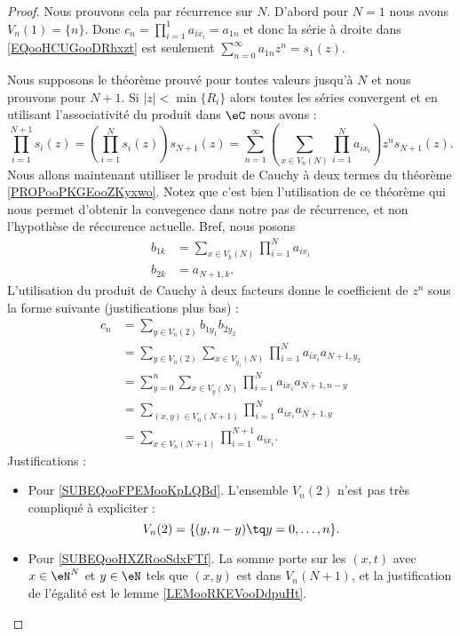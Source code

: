 \begin{proof}
	Nous prouvons cela par récurrence sur \( N\). D'abord pour \( N=1\) nous avons \( V_n(1)=\{ n \}\). Donc \( c_n=\prod_{i=1}^1a_{ix_i}=a_{1n}\) et donc la série à droite dans \eqref{EQooHCUGooDRhxzt} est seulement \( \sum_{n=0}^{\infty}a_{1n}z^n=s_1(z)\).

	Nous supposons le théorème prouvé pour toutes valeurs jusqu'à \( N\) et nous prouvons pour \( N+1\). Si \( | z |<\min\{ R_i \}\) alors toutes les séries convergent et en utilisant l'associativité du produit dans \( \eC\) nous avons :
	\begin{equation}
		\prod_{i=1}^{N+1}s_i(z)=\left( \prod_{i=1}^Ns_i(z) \right)s_{N+1}(z)=\sum_{n=1}^{\infty}\left( \sum_{x\in V_n(N)}\prod_{i=1}^Na_{ix_i} \right)z^ns_{N+1}(z).
	\end{equation}
	Nous allons maintenant utilliser le produit de Cauchy à deux termes du théorème \ref{PROPooPKGEooZKyxwo}. Notez que c'est bien l'utilisation de ce théorème qui nous permet d'obtenir la convegence dans notre pas de récurrence, et non l'hypothèse de réccurence actuelle. Bref, nous posons
	\begin{subequations}
		\begin{align}
			b_{1k} & =\sum_{x\in V_k(N)}\prod_{i=1}^Na_{ix_i} \\
			b_{2k} & =a_{N+1,k}.
		\end{align}
	\end{subequations}
	L'utilisation du produit de Cauchy à deux facteurs donne le coefficient de \( z^n\) sous la forme suivante (justifications plus bas)  :
	\begin{subequations}
		\begin{align}
			c_n & =\sum_{y\in V_n(2)}b_{1y_1}b_{2y_2}                                                                \\
			    & =\sum_{y\in V_n(2)}\sum_{x\in V_{y_1}(N)}\prod_{i=1}^Na_{ix_i}a_{N+1,y_2}                          \\
			    & =\sum_{y=0}^n\sum_{x\in V_y(N)}\prod_{i=1}^Na_{ix_i}a_{N+1,n-y}        \label{SUBEQooFPEMooKpLQBd} \\
			    & =\sum_{(x,y)\in V_n(N+1)}\prod_{i=1}^Na_{ix_i}a_{N+1, y}       \label{SUBEQooHXZRooSdxFTf}         \\
			    & =\sum_{x\in V_n(N+1)}\prod_{i=1}^{N+1}a_{ix_i}.
		\end{align}
	\end{subequations}
	Justifications :
	\begin{itemize}
		\item Pour \eqref{SUBEQooFPEMooKpLQBd}. L'ensemble \( V_n(2)\) n'est pas très compliqué à expliciter :
		      \begin{equation}
			      V_n(2)=\{ (y,n-y)\tq y=0,\ldots, n \}.
		      \end{equation}
		\item   Pour \eqref{SUBEQooHXZRooSdxFTf}. La somme porte sur les \( (x,t)\) avec \(x\in \eN^N\) et \( y\in \eN\) tels que \( (x,y) \) est dans \( V_n(N+1)\), et la justification de l'égalité est le lemme \ref{LEMooRKEVooDdpuHt}.
	\end{itemize}
\end{proof}

